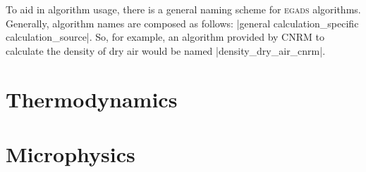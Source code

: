 \documentclass[a4paper,11pt]{report}
\newcommand{\egads}{\textsc{egads} }
\begin{document}
To aid in algorithm usage, there is a general naming scheme for \egads algorithms. Generally, algorithm names are composed as follows: |{general calculation}_{specific calculation}_{source}|. So, for example, an algorithm provided by CNRM to calculate the density of dry air would be named |density_dry_air_cnrm|.




\chapter{Thermodynamics}





























\chapter{Microphysics}


\end{document}

